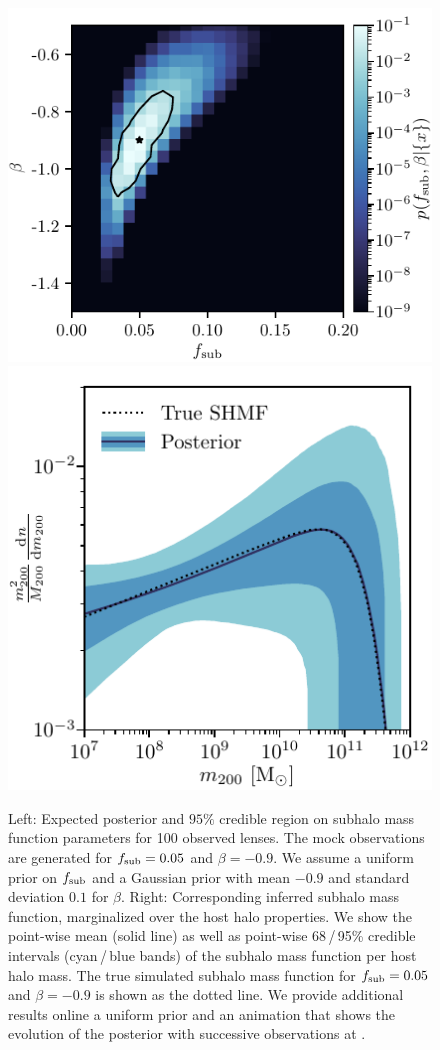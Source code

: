 \documentclass[twocolumn]{aastex63}
\begin{document}
\begin{figure}[t!]
\centering
\includegraphics[height=0.4\textwidth]{figures/posterior}%
\hspace*{0.075\textwidth}%
\includegraphics[height=0.4\textwidth]{figures/shmf}%
\hspace*{0.052\textwidth}%
\caption{Left: Expected posterior and $95\%$ credible region on subhalo mass function parameters for 100 observed lenses. The mock observations are generated for $f_{\mathrm{sub}} = 0.05$ and $\beta = -0.9$. We assume a uniform prior on $f_{\mathrm{sub}}$ and a Gaussian prior with mean $-0.9$ and standard deviation $0.1$ for $\beta$.  Right: Corresponding inferred subhalo mass function, marginalized over the host halo properties. We show the point-wise mean (solid line) as well as point-wise 68\,/\,95\% credible intervals (cyan\,/\,blue bands) of the subhalo mass function per host halo mass. The true simulated subhalo mass function for $f_{\mathrm{sub}} = 0.05$ and $\beta = -0.9$ is shown as the dotted line.  We provide additional results online a uniform prior and an animation that shows the evolution of the posterior with successive observations at .}
\label{fig:bayesian_post}
\end{figure}
\end{document}
